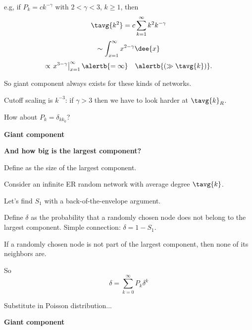 \begin{frame}[label=]
\begin{frame}[label=]
\begin{frame}[label=]
\begin{frame}[label=]
\begin{frame}[label=]
\begin{frame}[label=]
\begin{frame}[label=]
\begin{frame}[label=]
\begin{frame}[label=]
\begin{frame}[label=]
\begin{frame}[label=]
\begin{frame}[label=]
\begin{frame}[label=]
\begin{frame}[label=]
\begin{frame}[label=]
\begin{frame}[label=]
\begin{frame}[label=]
\begin{frame}[label=]
\begin{frame}[label=]
\begin{frame}[label=]
\begin{frame}[label=]
\begin{frame}[label=]
\begin{frame}[label=]
\begin{frame}[label=]
     
      e.g, if $P_k = c k^{-\gamma}$ with $2 < \gamma < 3$, $k \ge 1$, 
      then
      $$
      \tavg{k^2} 
      = c \sum_{k=1}^{\infty}
      k^2 k^{-\gamma}
      $$
      {
        $$
        \sim
        \int_{x=1}^{\infty} x^{2-\gamma} \dee{x}
        $$
      }
      {
        $$
        \propto
        \left.
        x^{3-\gamma}
        \right|_{x=1}^{\infty}
        {
          \alertb{=\infty}
        }
        {
          \quad \alertb{(\gg \tavg{k})}.
        }
        $$
      }
    
      So giant component \alert{always exists}
      for these kinds of networks.
    
      Cutoff scaling is $k^{-3}$: if $\gamma>3$ then
      we have to look harder at $\tavg{k}_R$.
    
      How about $P_k = \delta_{kk_0}$?
    
  
  

\begin{frame}[label=]
  \textbf{Giant component}
  
  \small
  \textbf{And how big is the largest component?}
    
    
      Define  as the \alert{size of the largest component}.
    
      Consider an infinite ER random network with average
      degree $\tavg{k}$.
     
      Let's find $S_1$ with a back-of-the-envelope argument.
     
      Define \alert{$\delta$} as the probability that a randomly
      chosen node \alert{does not} belong to the largest component.
     Simple connection: $\delta = 1 - S_1$.
    
       If a randomly chosen node is not part
      of the largest component, then none of its neighbors are.
    
      So
      $$
      \delta = \sum_{k=0}^\infty P_k \delta^k
      $$
    
      Substitute in Poisson distribution...
    
  


\begin{frame}[label=]
  \textbf{Giant component}
  
  
   

\end{frame}
\end{frame}
\end{frame}
\end{frame}
\end{frame}
\end{frame}
\end{frame}
\end{frame}
\end{frame}
\end{frame}
\end{frame}
\end{frame}
\end{frame}
\end{frame}
\end{frame}
\end{frame}
\end{frame}
\end{frame}
\end{frame}
\end{frame}
\end{frame}
\end{frame}
\end{frame}
\end{frame}
\end{frame}
\end{frame}
